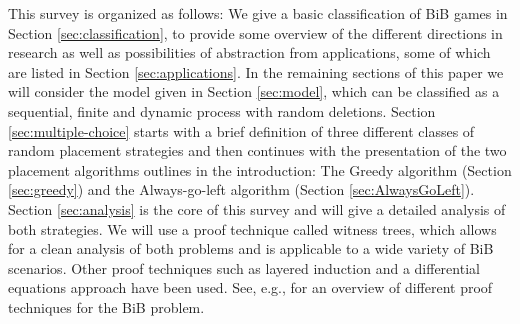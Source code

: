 \documentclass[a4paper,12pt]{article}
\begin{document}
This survey is organized as follows: We give a basic classification of BiB games in Section \ref{sec:classification}, to provide some overview of the different directions in research as well as possibilities of abstraction from applications, some of which are listed in Section \ref{sec:applications}. In the remaining sections of this paper we will consider the model given in Section \ref{sec:model}, which can be classified as a sequential, finite and dynamic process with random deletions. Section \ref{sec:multiple-choice} starts with a brief definition of three different classes of random placement strategies and then continues with the presentation of the two placement algorithms outlines in the introduction: The  Greedy algorithm (Section \ref{sec:greedy}) and the Always-go-left algorithm (Section \ref{sec:AlwaysGoLeft}). Section \ref{sec:analysis} is the core of this survey and will give a detailed analysis of both strategies. We will use a proof technique called witness trees, which allows for a clean analysis of both problems and is applicable to a wide variety of BiB scenarios. Other proof techniques such as layered induction and a differential equations approach have been used. See, e.g., \cite{MRS01} for an overview of different proof techniques for the BiB problem.

\begin{comment}
In Section \ref{sec:strategies}, we will provide asymptotic bounds for the ad dative gap of this strategy, which we will then use to devise more complex strategies that significantly reduce these bounds. 
\end{comment}

\begin{comment}
These result may sometimes seem surprising, which is why we will denote a significant part of this article to demonstrate proofs in detail. This proof technique may be useful for devising asymptotic bounds for the additive gap of different BiB scenarios and strategies.
\end{comment}
\end{document}
